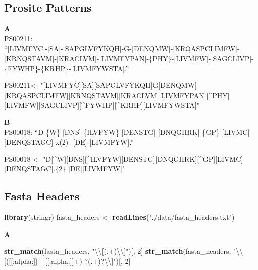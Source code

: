 \documentclass[]{book}
\newenvironment{Shaded}{\begin{snugshade}}{\end{snugshade}}
\newcommand{\CharTok}[1]{\textcolor[rgb]{0.31,0.60,0.02}{#1}}
\newcommand{\DecValTok}[1]{\textcolor[rgb]{0.00,0.00,0.81}{#1}}
\newcommand{\KeywordTok}[1]{\textcolor[rgb]{0.13,0.29,0.53}{\textbf{#1}}}
\newcommand{\NormalTok}[1]{#1}
\newcommand{\StringTok}[1]{\textcolor[rgb]{0.31,0.60,0.02}{#1}}
\begin{document}
\hypertarget{prosite-patterns-2}{%
\subsection{Prosite Patterns}\label{prosite-patterns-2}}

\textbf{A}\\
PS00211:\\
``{[}LIVMFYC{]}-{[}SA{]}-{[}SAPGLVFYKQH{]}-G-{[}DENQMW{]}-{[}KRQASPCLIMFW{]}-{[}KRNQSTAVM{]}-{[}KRACLVM{]}-{[}LIVMFYPAN{]}-\{PHY\}-{[}LIVMFW{]}-{[}SAGCLIVP{]}-\{FYWHP\}-\{KRHP\}-{[}LIVMFYWSTA{]}.''

\begin{Shaded}
\begin{Highlighting}[]
\NormalTok{PS00211<-}\StringTok{ "[LIVMFYC][SA][SAPGLVFYKQH]G[DENQMW][KRQASPCLIMFW][KRNQSTAVM][KRACLVM][LIVMFYPAN][^PHY][LIVMFW][SAGCLIVP][^FYWHP][^KRHP][LIVMFYWSTA]"}
\end{Highlighting}
\end{Shaded}

\textbf{B}\\
PS00018:
``D-\{W\}-{[}DNS{]}-\{ILVFYW\}-{[}DENSTG{]}-{[}DNQGHRK{]}-\{GP\}-{[}LIVMC{]}-{[}DENQSTAGC{]}-x(2)- {[}DE{]}-{[}LIVMFYW{]}.''

\begin{Shaded}
\begin{Highlighting}[]
\NormalTok{PS00018 <-}\StringTok{ "D[^W][DNS][^ILVFYW][DENSTG][DNQGHRK][^GP][LIVMC][DENQSTAGC].\{2\} [DE][LIVMFYW]"}
\end{Highlighting}
\end{Shaded}

\hypertarget{fasta-headers-1}{%
\subsection{Fasta Headers}\label{fasta-headers-1}}

\begin{Shaded}
\begin{Highlighting}[]
\KeywordTok{library}\NormalTok{(stringr)}
\NormalTok{fasta_headers <-}\StringTok{ }\KeywordTok{readLines}\NormalTok{(}\StringTok{"./data/fasta_headers.txt"}\NormalTok{)}
\end{Highlighting}
\end{Shaded}

\textbf{A}

\begin{Shaded}
\begin{Highlighting}[]
\KeywordTok{str_match}\NormalTok{(fasta_headers, }\StringTok{"}\CharTok{\textbackslash{}\textbackslash{}}\StringTok{[(.+)}\CharTok{\textbackslash{}\textbackslash{}}\StringTok{]"}\NormalTok{)[, }\DecValTok{2}\NormalTok{]}
\KeywordTok{str_match}\NormalTok{(fasta_headers, }\StringTok{"}\CharTok{\textbackslash{}\textbackslash{}}\StringTok{[([[:alpha:]]+ [[:alpha:]]+) ?(.+)?}\CharTok{\textbackslash{}\textbackslash{}}\StringTok{]"}\NormalTok{)[, }\DecValTok{2}\NormalTok{]}
\end{Highlighting}
\end{Shaded}
\end{document}

